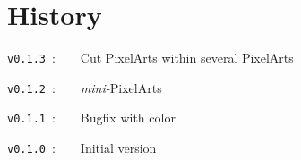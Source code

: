 \documentclass{article}
\begin{document}
\newpage

\begin{PresentationCode}{}
\end{PresentationCode}

\pagebreak

\begin{PresentationCode}{}
\end{PresentationCode}

\pagebreak

\part{History}

\verb|v0.1.3|~:~~~~Cut PixelArts within several PixelArts

\verb|v0.1.2|~:~~~~\textit{mini-}PixelArts

\verb|v0.1.1|~:~~~~Bugfix with color

\verb|v0.1.0|~:~~~~Initial version
\end{document}
